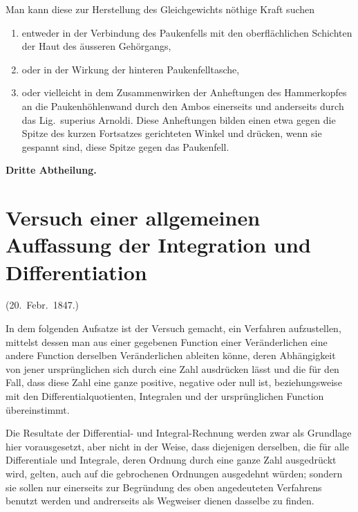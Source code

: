 \documentclass[12pt,a4paper]{article}
\begin{document}
Man kann diese zur Herstellung des Gleichgewichts n\"othige Kraft suchen

\begin{enumerate}
\item entweder in der Verbindung des Paukenfells mit den oberfl\"achlichen Schichten der Haut des \"ausseren Geh\"organgs,
\item oder in der Wirkung der hinteren Paukenfelltasche,
\item oder vielleicht in dem Zusammenwirken der Anheftungen des Hammerkopfes an die Paukenh\"ohlenwand durch den Ambos einerseits und anderseits durch das Lig.\ superius Arnoldi. Diese Anheftungen bilden einen etwa gegen die Spitze des kurzen Fortsatzes gerichteten Winkel und dr\"ucken, wenn sie gespannt sind, diese Spitze gegen das Paukenfell.
\end{enumerate}

\newpage

\begin{center}
\textbf{Dritte Abtheilung.}
\end{center}

\newpage

\section{Versuch einer allgemeinen Auffassung der Integration und Differentiation}

\begin{footnotesize}
\begin{flushright}
(20.\ Febr.\ 1847.)
\end{flushright}
\end{footnotesize}

In dem folgenden Aufsatze ist der Versuch gemacht, ein Verfahren aufzustellen, mittelst dessen man aus einer gegebenen Function einer Ver\"anderlichen eine andere Function derselben Ver\"anderlichen ableiten k\"onne, deren Abh\"angigkeit von jener urspr\"unglichen sich durch eine Zahl ausdr\"ucken l\"asst und die f\"ur den Fall, dass diese Zahl eine ganze positive, negative oder null ist, beziehungsweise mit den Differentialquotienten, Integralen und der urspr\"unglichen Function \"ubereinstimmt.

Die Resultate der Differential- und Integral-Rechnung werden zwar als Grundlage hier vorausgesetzt, aber nicht in der Weise, dass diejenigen derselben, die f\"ur alle Differentiale und Integrale, deren Ordnung durch eine ganze Zahl ausgedr\"uckt wird, gelten, auch auf die gebrochenen Ordnungen ausgedehnt w\"urden; sondern sie sollen nur einerseits zur Begr\"undung des oben angedeuteten Verfahrens benutzt werden und andrerseits als Wegweiser dienen dasselbe zu finden.
\end{document}
